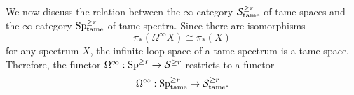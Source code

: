 	



We now discuss the relation between the $\infty$-category ${\mathcal{S}}^{\geq r}_{\operatorname{\operatorname{tame}}}$ of tame spaces and the $\infty$-category $\operatorname{Sp}^{\geq r}_{\operatorname{\operatorname{tame}}}$ of tame spectra.
Since there are isomorphisms
$$
\pi_*(\Omega^{\infty}X) \cong \pi_* (X)
$$
for any spectrum $X$,
		the infinite loop space of a tame spectrum is a tame space. 
Therefore, the functor $\Omega^{\infty}:\operatorname{Sp}^{\geq r}\to 
{\mathcal{S}}^{\geq r}$ restricts to a functor
$$
\Omega^{\infty}: \operatorname{Sp}^{\geq r}_{\operatorname{\operatorname{tame}}} 
\to 
{\mathcal{S}}^{\geq r}_{\operatorname{\operatorname{tame}}}.
$$



